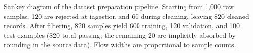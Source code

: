 \caption{Sankey diagram of the dataset preparation pipeline. Starting from 1{,}000 raw samples, 120 are rejected at ingestion and 60 during cleaning, leaving 820 cleaned records. After filtering, 820 samples yield 600 training, 120 validation, and 100 test examples (820 total passing; the remaining 20 are implicitly absorbed by rounding in the source data). Flow widths are proportional to sample counts.}
